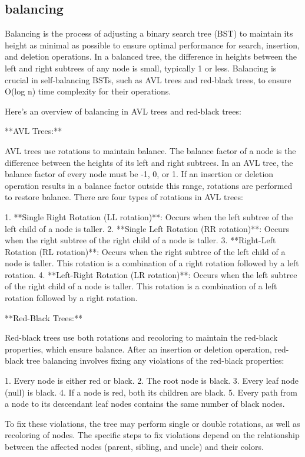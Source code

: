 \documentclass{article}
\begin{document}
\subsection{balancing}

Balancing is the process of adjusting a binary search tree (BST) to maintain its height as minimal as possible to ensure optimal performance for search, insertion, and deletion operations. In a balanced tree, the difference in heights between the left and right subtrees of any node is small, typically 1 or less. Balancing is crucial in self-balancing BSTs, such as AVL trees and red-black trees, to ensure O(log n) time complexity for their operations.

Here's an overview of balancing in AVL trees and red-black trees:

**AVL Trees:**

AVL trees use rotations to maintain balance. The balance factor of a node is the difference between the heights of its left and right subtrees. In an AVL tree, the balance factor of every node must be -1, 0, or 1. If an insertion or deletion operation results in a balance factor outside this range, rotations are performed to restore balance. There are four types of rotations in AVL trees:

1. **Single Right Rotation (LL rotation)**: Occurs when the left subtree of the left child of a node is taller.
2. **Single Left Rotation (RR rotation)**: Occurs when the right subtree of the right child of a node is taller.
3. **Right-Left Rotation (RL rotation)**: Occurs when the right subtree of the left child of a node is taller. This rotation is a combination of a right rotation followed by a left rotation.
4. **Left-Right Rotation (LR rotation)**: Occurs when the left subtree of the right child of a node is taller. This rotation is a combination of a left rotation followed by a right rotation.

**Red-Black Trees:**

Red-black trees use both rotations and recoloring to maintain the red-black properties, which ensure balance. After an insertion or deletion operation, red-black tree balancing involves fixing any violations of the red-black properties:

1. Every node is either red or black.
2. The root node is black.
3. Every leaf node (null) is black.
4. If a node is red, both its children are black.
5. Every path from a node to its descendant leaf nodes contains the same number of black nodes.

To fix these violations, the tree may perform single or double rotations, as well as recoloring of nodes. The specific steps to fix violations depend on the relationship between the affected nodes (parent, sibling, and uncle) and their colors.
\end{document}

